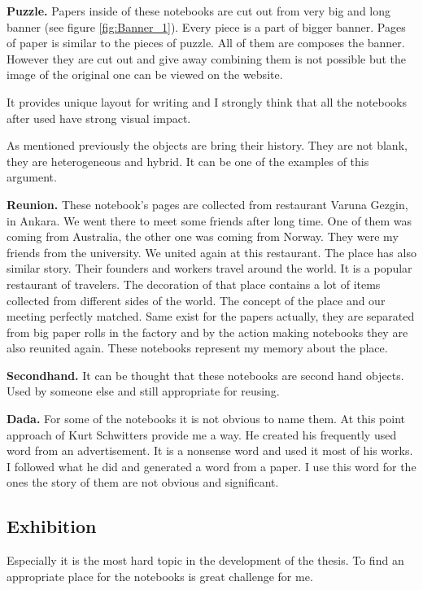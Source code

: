 \textbf{Puzzle.} Papers inside of these notebooks are cut out from very big and long banner (see figure \ref{fig:Banner_1}). Every piece is a part of bigger banner. Pages of paper is similar to the pieces of puzzle. All of them are composes the banner. However they are cut out and give away combining them is not possible but the image of the original one can be viewed on the website.

It provides unique layout for writing and I strongly think that all the notebooks after used have strong visual impact.

As mentioned previously the objects are bring their history. They are not blank, they are heterogeneous and hybrid. It can be one of the examples of this argument. 

\textbf{Reunion.} These notebook's pages are collected from restaurant Varuna Gezgin, in Ankara. We went there to meet some friends after long time. One of them was coming from Australia, the other one was coming from Norway. They were my friends from the university. We united again at this restaurant. The place has also similar story. Their founders and workers travel around the world. It is a popular restaurant of travelers. The decoration of that place contains a lot of items collected from different sides of the world. The concept of the place and our meeting perfectly matched. Same exist for the papers actually, they are separated from big paper rolls in the factory and by the action making notebooks they are also reunited again. These notebooks represent my memory about the place.

\textbf{Secondhand.} It can be thought that these notebooks are second hand objects. Used by someone else and still appropriate for reusing.

\textbf{Dada.} For some of the notebooks it is not obvious to name them. At this point approach of Kurt Schwitters provide me a way. He created his frequently used word  from an advertisement. It is a nonsense word and used it most of his works. I followed what he did and generated a word from a paper. I use this word for the ones the story of them are not obvious and significant.

%
%
\subsection{Exhibition}
Especially it is the most hard topic in the development of the thesis. To find an appropriate place for the notebooks is great challenge for me.

